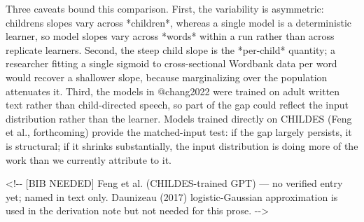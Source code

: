 \documentclass[
  11pt,
]{article}
\newenvironment{Shaded}{\begin{snugshade}}{\end{snugshade}}
\newcommand{\CommentTok}[1]{\textcolor[rgb]{0.37,0.37,0.37}{#1}}
\newcommand{\NormalTok}[1]{\textcolor[rgb]{0.00,0.23,0.31}{#1}}
\begin{document}
\begin{Shaded}
\begin{Highlighting}[]
\NormalTok{Three caveats bound this comparison. First, the variability is asymmetric:}
\NormalTok{children\textquotesingle{}s slopes vary across *children*, whereas a single model is a}
\NormalTok{deterministic learner, so model slopes vary across *words* within a run}
\NormalTok{rather than across replicate learners. Second, the steep child slope is}
\NormalTok{the *per{-}child* quantity; a researcher fitting a single sigmoid to}
\NormalTok{cross{-}sectional Wordbank data per word would recover a shallower slope,}
\NormalTok{because marginalizing over the population attenuates it. Third, the models}
\NormalTok{in @chang2022 were trained on adult written text rather than}
\NormalTok{child{-}directed speech, so part of the gap could reflect the input}
\NormalTok{distribution rather than the learner. Models trained directly on CHILDES}
\NormalTok{(Feng et al., forthcoming) provide the matched{-}input test: if the gap}
\NormalTok{largely persists, it is structural; if it shrinks substantially, the input}
\NormalTok{distribution is doing more of the work than we currently attribute to it.}

\CommentTok{\textless{}!{-}{-} [BIB NEEDED] Feng et al. (CHILDES{-}trained GPT) — no verified entry yet;}
\CommentTok{     named in text only. Daunizeau (2017) logistic{-}Gaussian approximation is}
\CommentTok{     used in the derivation note but not needed for this prose. {-}{-}\textgreater{}}
\end{Highlighting}
\end{Shaded}
\end{document}
